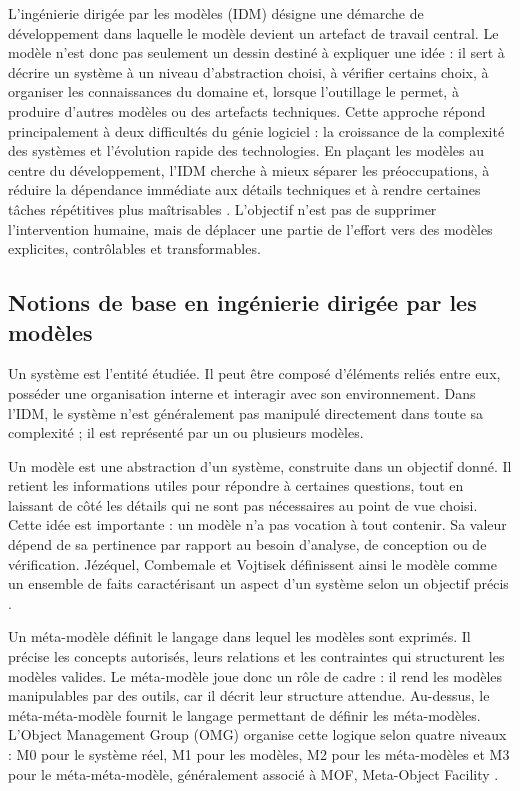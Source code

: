 L'ingénierie dirigée par les modèles (IDM) désigne une démarche de développement dans laquelle le modèle devient un artefact de travail central. Le modèle n'est donc pas seulement un dessin destiné à expliquer une idée : il sert à décrire un système à un niveau d'abstraction choisi, à vérifier certains choix, à organiser les connaissances du domaine et, lorsque l'outillage le permet, à produire d'autres modèles ou des artefacts techniques. Cette approche répond principalement à deux difficultés du génie logiciel : la croissance de la complexité des systèmes et l'évolution rapide des technologies. En plaçant les modèles au centre du développement, l'IDM cherche à mieux séparer les préoccupations, à réduire la dépendance immédiate aux détails techniques et à rendre certaines tâches répétitives plus maîtrisables \cite{jezequel2012,meghzili2022}. L'objectif n'est pas de supprimer l'intervention humaine, mais de déplacer une partie de l'effort vers des modèles explicites, contrôlables et transformables.

\subsection{Notions de base en ingénierie dirigée par les modèles}

Un système est l'entité étudiée. Il peut être composé d'éléments reliés entre eux, posséder une organisation interne et interagir avec son environnement. Dans l'IDM, le système n'est généralement pas manipulé directement dans toute sa complexité ; il est représenté par un ou plusieurs modèles.

Un modèle est une abstraction d'un système, construite dans un objectif donné. Il retient les informations utiles pour répondre à certaines questions, tout en laissant de côté les détails qui ne sont pas nécessaires au point de vue choisi. Cette idée est importante : un modèle n'a pas vocation à tout contenir. Sa valeur dépend de sa pertinence par rapport au besoin d'analyse, de conception ou de vérification. Jézéquel, Combemale et Vojtisek définissent ainsi le modèle comme un ensemble de faits caractérisant un aspect d'un système selon un objectif précis \cite{jezequel2012}.

Un méta-modèle définit le langage dans lequel les modèles sont exprimés. Il précise les concepts autorisés, leurs relations et les contraintes qui structurent les modèles valides. Le méta-modèle joue donc un rôle de cadre : il rend les modèles manipulables par des outils, car il décrit leur structure attendue. Au-dessus, le méta-méta-modèle fournit le langage permettant de définir les méta-modèles. L'Object Management Group (OMG) organise cette logique selon quatre niveaux : M0 pour le système réel, M1 pour les modèles, M2 pour les méta-modèles et M3 pour le méta-méta-modèle, généralement associé à MOF, Meta-Object Facility \cite{jezequel2012,omgmof}.

